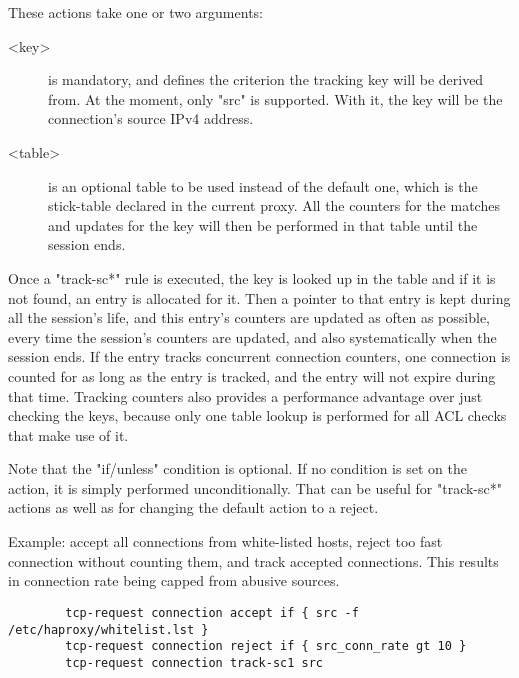 {\begin{itemize}
        These actions take one or two arguments:
        \begin{description}
        \item[<key>] is mandatory, and defines the criterion the tracking key will
                  be derived from. At the moment, only "src" is supported. With
                  it, the key will be the connection's source IPv4 address.

        \item[<table>] is an optional table to be used instead of the default one,
                  which is the stick-table declared in the current proxy. All
                  the counters for the matches and updates for the key will
                  then be performed in that table until the session ends.
        \end{description}

        Once a "track-sc*" rule is executed, the key is looked up in the table
        and if it is not found, an entry is allocated for it. Then a pointer to
        that entry is kept during all the session's life, and this entry's
        counters are updated as often as possible, every time the session's
        counters are updated, and also systematically when the session ends.
        If the entry tracks concurrent connection counters, one connection is
        counted for as long as the entry is tracked, and the entry will not
        expire during that time. Tracking counters also provides a performance
        advantage over just checking the keys, because only one table lookup is
        performed for all ACL checks that make use of it.
  \end{itemize}

  Note that the "if/unless" condition is optional. If no condition is set on
  the action, it is simply performed unconditionally. That can be useful for
  "track-sc*" actions as well as for changing the default action to a reject.

  Example: accept all connections from white-listed hosts, reject too fast
           connection without counting them, and track accepted connections.
           This results in connection rate being capped from abusive sources.

  \begin{verbatim}
        tcp-request connection accept if { src -f /etc/haproxy/whitelist.lst }
        tcp-request connection reject if { src_conn_rate gt 10 }
        tcp-request connection track-sc1 src
  \end{verbatim}

}
